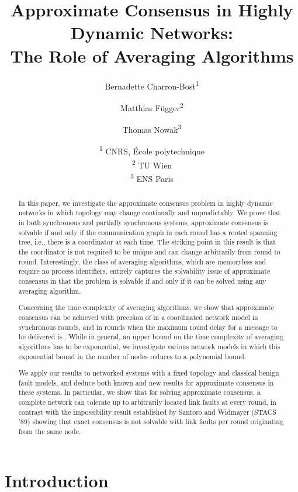 \documentclass[a4paper]{article}
\title{Approximate Consensus in Highly Dynamic Networks: \\
	 The Role of Averaging Algorithms}
\author{Bernadette Charron-Bost\textsuperscript{1} \and Matthias
F\"ugger\textsuperscript{2} \and Thomas Nowak\textsuperscript{3}}
\date{\textsuperscript{1} CNRS, \'Ecole polytechnique\\
\textsuperscript{2} TU Wien\\
\textsuperscript{3} ENS Paris}
\theoremstyle{newthm}
\begin{document}
\maketitle

\begin{abstract}
In this paper, we investigate the approximate consensus problem in highly dynamic networks 
        in which topology may change continually and unpredictably.
We prove that  in both synchronous and partially synchronous systems,
        approximate consensus is solvable if and only if the
        communication graph in each round has a rooted spanning tree, i.e., there is a coordinator at each time.
The striking point in this result is that the coordinator is not required  to be unique and can
        change  arbitrarily from round to round.
Interestingly, the  class of averaging algorithms, which are memoryless
	and require no process identifiers,  entirely captures the solvability issue
        of approximate consensus in that the problem is solvable if and only if
        it can be solved using any averaging algorithm.

Concerning the time complexity of averaging algorithms, we show that approximate consensus can be 
	achieved with precision of  
        in a coordinated network model in  synchronous 
        rounds, and in  rounds when the maximum 
        round delay for a message to be delivered is .
While in general, an upper bound on the time complexity of averaging algorithms has to be exponential,
        we investigate various network models in which this exponential bound in the number of nodes
        reduces to a polynomial  bound.

We  apply our results to networked systems with a fixed topology and classical benign  fault models,
        and deduce  both known and new results for approximate consensus in these systems.
In particular,  we show that for solving approximate consensus, a complete network can 
        tolerate up to  
        arbitrarily located  link faults at every
        round, in contrast with the impossibility result 
         established by Santoro and Widmayer (STACS '89) showing that 
         exact consensus is not solvable with  link faults per round originating from the same node.
\end{abstract}

\setcounter{footnote}{3}

\section{Introduction}
\end{document}
